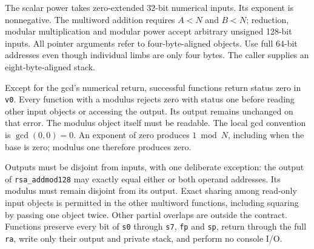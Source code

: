 The scalar power takes zero-extended 32-bit numerical inputs. Its exponent is
nonnegative. The multiword addition requires \(A<N\) and \(B<N\); reduction, modular
multiplication and modular power accept arbitrary unsigned 128-bit inputs. All pointer
arguments refer to four-byte-aligned objects. Use full 64-bit addresses even though
individual limbs are only four bytes. The caller supplies an eight-byte-aligned stack.

Except for the gcd's numerical return, successful functions return status zero in
\texttt{v0}. Every function with a modulus rejects zero with status one before reading
other input objects or accessing the output. Its output remains unchanged on that
error. The modulus object itself must be readable. The local gcd convention is
\(\gcd(0,0)=0\). An exponent of zero produces \(1\bmod N\), including when the base
is zero; modulus one therefore produces zero.

Outputs must be disjoint from inputs, with one deliberate exception: the output of
\texttt{rsa\_addmod128} may exactly equal either or both operand addresses. Its modulus
must remain disjoint from its output. Exact sharing among read-only input objects is
permitted in the other multiword functions, including squaring by passing one object
twice. Other partial overlaps are outside the contract. Functions preserve every bit
of \texttt{s0} through \texttt{s7}, \texttt{fp} and \texttt{sp}, return through the full
\texttt{ra}, write only their output and private stack, and perform no console I/O.
